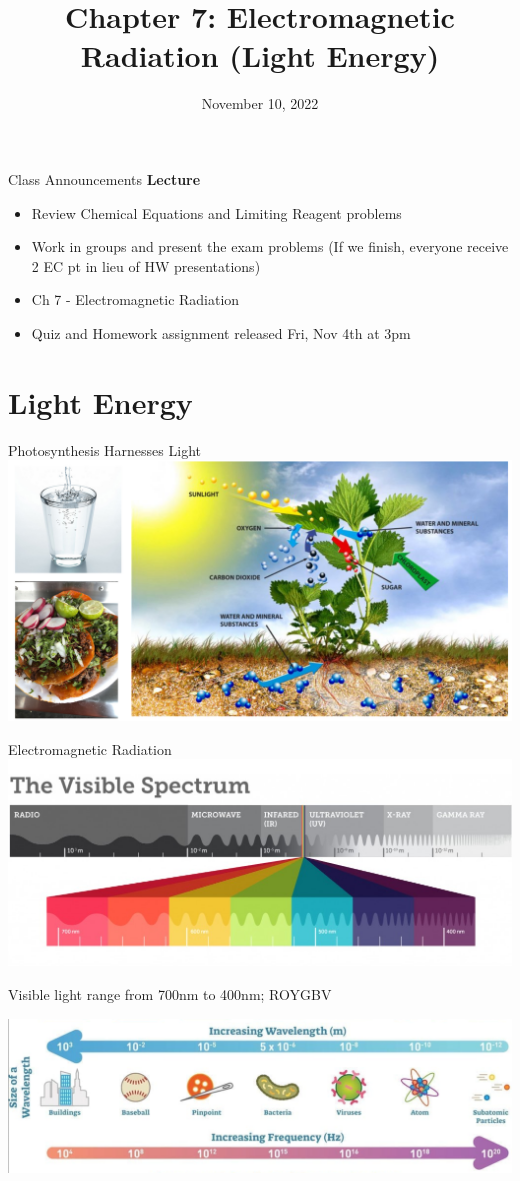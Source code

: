 \documentclass[11pt]{beamer}
\title{Chapter 7: Electromagnetic Radiation (Light Energy)}
\institute{Chemistry Department, Cypress College}
\date{November 10, 2022}
\begin{document}
\begin{frame}
  \titlepage
\end{frame}

\begin{frame}{Class Announcements}
  \textbf{Lecture}
  \begin{itemize}
  \item Review Chemical Equations and Limiting Reagent problems
  \item Work in groups and present the exam problems
    (If we finish, everyone receive 2 EC pt in lieu of HW presentations)
  \item Ch 7 - Electromagnetic Radiation
  \item Quiz and Homework assignment released Fri, Nov 4th at 3pm
  \end{itemize}
\end{frame}

\section{Light Energy}

\begin{frame}{Photosynthesis Harnesses Light}
  \centering
  \includegraphics[trim={8in 0 0 0},clip,width=1\linewidth]{food_pic}
\end{frame}

\begin{frame}{Electromagnetic Radiation}
  \centering
  \includegraphics[width=0.85\linewidth]{visible_light}
  
  Visible light range from 700nm to 400nm;
  ROYGBV
  
  \includegraphics[width=0.85\linewidth]{wave_freq_size}
\end{frame}
\end{document}
